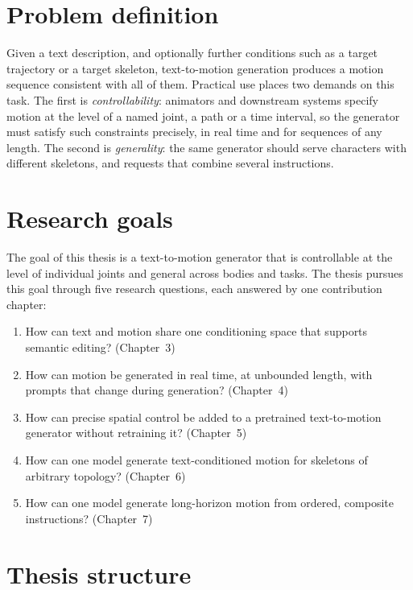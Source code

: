 \documentclass[11pt,a4paper]{report}
\begin{document}
\section{Problem definition}

Given a text description, and optionally further conditions such as a target
trajectory or a target skeleton, text-to-motion generation produces a motion
sequence consistent with all of them. Practical use places two demands on this
task. The first is \emph{controllability}: animators and downstream systems
specify motion at the level of a named joint, a path or a time interval, so the
generator must satisfy such constraints precisely, in real time and for
sequences of any length. The second is \emph{generality}: the same generator
should serve characters with different skeletons, and requests that combine
several instructions.

\section{Research goals}

The goal of this thesis is a text-to-motion generator that is controllable at
the level of individual joints and general across bodies and tasks. The thesis
pursues this goal through five research questions, each answered by one
contribution chapter:

\begin{enumerate}[label=\textbf{RQ\arabic*}, leftmargin=3em]
\item How can text and motion share one conditioning space that supports
  semantic editing? (Chapter~3)
\item How can motion be generated in real time, at unbounded length, with
  prompts that change during generation? (Chapter~4)
\item How can precise spatial control be added to a pretrained text-to-motion
  generator without retraining it? (Chapter~5)
\item How can one model generate text-conditioned motion for skeletons of
  arbitrary topology? (Chapter~6)
\item How can one model generate long-horizon motion from ordered, composite
  instructions? (Chapter~7)
\end{enumerate}

\section{Thesis structure}
\end{document}
